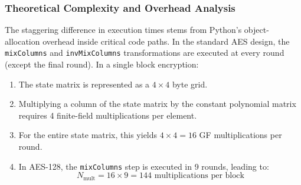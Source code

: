 \documentclass[11pt,a4paper]{article}
\begin{document}
\subsubsection{Theoretical Complexity and Overhead Analysis}
The staggering difference in execution times stems from Python's object-allocation overhead inside critical code paths. In the standard AES design, the \texttt{mixColumns} and \texttt{invMixColumns} transformations are executed at every round (except the final round). In a single block encryption:
\begin{enumerate}
    \item The state matrix is represented as a $4 \times 4$ byte grid.
    \item Multiplying a column of the state matrix by the constant polynomial matrix requires 4 finite-field multiplications per element.
    \item For the entire state matrix, this yields $4 \times 4 = 16$ GF multiplications per round.
    \item In AES-128, the \texttt{mixColumns} step is executed in 9 rounds, leading to:
    \begin{equation}
        N_{\text{mult}} = 16 \times 9 = 144 \text{ multiplications per block}
    \end{equation}
\end{enumerate}
\end{document}

